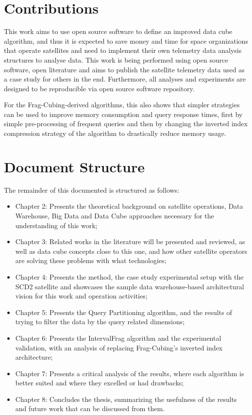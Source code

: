 \section{Contributions}\label{ch:intro:contrib}

This work aims to use open source software to define an improved data cube algorithm, and thus it is expected to save money and time for space organizations that operate satellites and need to implement their own telemetry data analysis structures to analyse data.
This work is being performed using open source software, open literature and aims to publish the satellite telemetry data used as a case study for others in the end.
Furthermore, all analyses and experiments are designed to be reproducible via open source software repository.

For the Frag-Cubing-derived algorithms, this also shows that simpler strategies can be used to improve memory consumption and query response times, first by simple pre-processing of frequent queries and then by changing the inverted index compression strategy of the algorithm to drastically reduce memory usage.

\section{Document Structure}\label{ch:intro:org}

The remainder of this documented is structured as follows:

\begin{itemize}[noitemsep]
  \item{Chapter 2}: Presents the theoretical background on satellite operations, Data Warehouse, Big Data and Data Cube approaches necessary for the understanding of this work;
  \item{Chapter 3}: Related works in the literature will be presented and reviewed, as well as data cube concepts close to this one, and how other satellite operators are solving these problems with what technologies;
  \item{Chapter 4}: Presents the method, the case study experimental setup with the SCD2 satellite and showcases the sample data warehouse-based architectural vision for this work and operation activities;
  \item{Chapter 5}: Presents the Query Partitioning algorithm, and the results of trying to filter the data by the query related dimensions;
  \item{Chapter 6}: Presents the IntervalFrag algorithm and the experimental validation, with an analysis of replacing Frag-Cubing's inverted index architecture;
  \item{Chapter 7}: Presents a critical analysis of the results, where each algorithm is better suited and where they excelled or had drawbacks;
  \item{Chapter 8}: Concludes the thesis, summarizing the usefulness of the results and future work that can be discussed from them.
\end{itemize}


